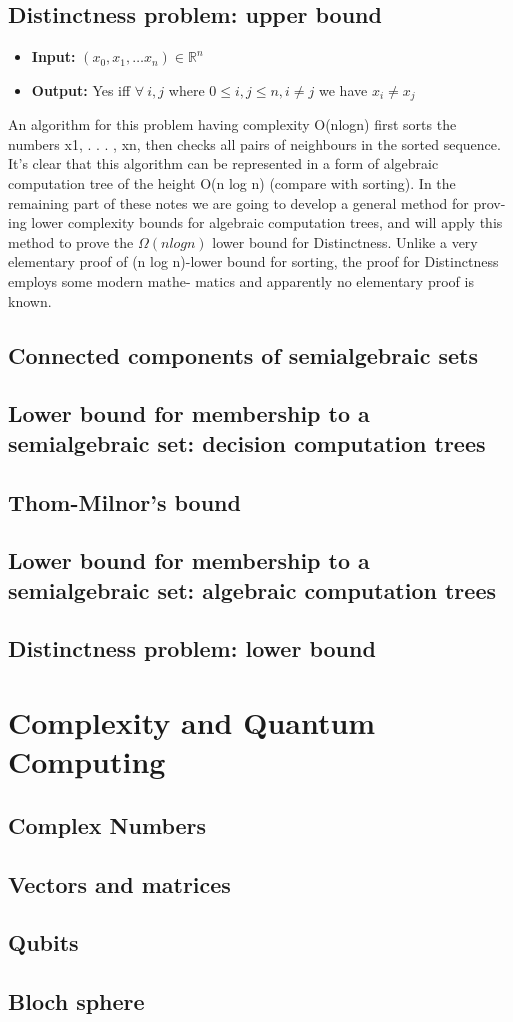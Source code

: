 \documentclass{article}
\theoremstyle{definition}
\begin{document}
\subsection{Distinctness problem: upper bound}
\begin{itemize}
    \item \textbf{Input:} $(x_0, x_1,\dots x_n) \in \mathbb{R}^n$
    \item \textbf{Output:} Yes iff $\forall\ i,j$ where $0 \leq i,j \leq n, i \neq j$ we have $x_i \neq x_j$
\end{itemize}
An algorithm for this problem having complexity O(nlogn) first sorts the numbers x1, . . . , xn,
then checks all pairs of neighbours in the sorted sequence.
It’s clear that this algorithm can be represented in a form of algebraic computation tree of the height O(n log n) (compare with sorting).
In the remaining part of these notes we are going to develop a general method for prov- ing lower complexity bounds for algebraic computation trees,
and will apply this method to prove the $\Omega(nlogn)$ lower bound for Distinctness.
Unlike a very elementary proof of (n log n)-lower bound for sorting,
the proof for Distinctness employs some modern mathe- matics and apparently no elementary proof is known.

\subsection{Connected components of semialgebraic sets}
\subsection{Lower bound for membership to a semialgebraic set: decision computation trees}
\subsection{Thom-Milnor’s bound}
\subsection{Lower bound for membership to a semialgebraic set: algebraic computation trees}
\subsection{Distinctness problem: lower bound}

\pagebreak
\section{Complexity and Quantum Computing}
\subsection{Complex Numbers}
\subsection{Vectors and matrices}
\subsection{Qubits}
\subsection{Bloch sphere}
\end{document}

